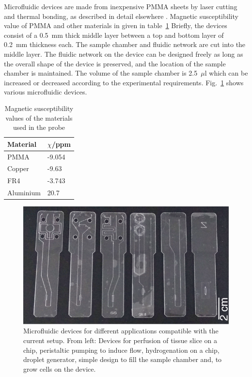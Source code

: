 \documentclass[preprint,5p]{elsarticle}
\newcommand{\fig}[1]{Fig.~\ref{#1}}
\begin{document}
Microfluidic devices are made from inexpensive PMMA sheets by laser cutting and
thermal bonding, as described in detail elsewhere \cite{yilmaz_bonding}. \cbstart Magnetic susceptibility value of PMMA and other materials in given in table~\ref{tab:susceptibility}\cbend
Briefly, the devices consist of a 0.5~mm thick middle layer between a  top and
bottom layer of 0.2~mm thickness each. The sample chamber and fluidic network
are cut into the middle layer. The fluidic network on the device can be designed
freely as long as the overall shape of the device is preserved, and the location
of the sample chamber is maintained. The volume of the sample chamber is 2.5~$\mu$l which can be increased or decreased according to the experimental requirements. \cbstart \fig{fig:device} shows various microfluidic devices.\cbend
\cbstart
\begin{table}[h]
\centering
\caption{Magnetic susceptibility values of the materials used in the probe\cite{wapler-2014,schenck-1996}}
\label{tab:susceptibility}
\begin{tabular}{||p{.3\linewidth}|p{.3\linewidth}||}
\hline
Material   & $\chi$/ppm	\\
\hline
PMMA		&-9.054	\\
Copper	&-9.63	\\
FR4	&-3.743		\\
Aluminium	&20.7	\\
\hline
\end{tabular}
\end{table}
\cbend
\cbstart
\begin{figure}
\centering
\includegraphics[width=\linewidth,keepaspectratio=true]{./figures/ms5n17-tlp-im-181007-devices.png}
\caption{Microfluidic devices for different applications compatible with the current setup.
From left: Devices for perfusion of tissue slice on a chip, peristaltic pumping to induce flow,
hydrogenation on a chip, droplet generator, simple design to fill the sample chamber and,
to grow cells on the device.}
\label{fig:device}
\end{figure}
\cbend
\end{document}
